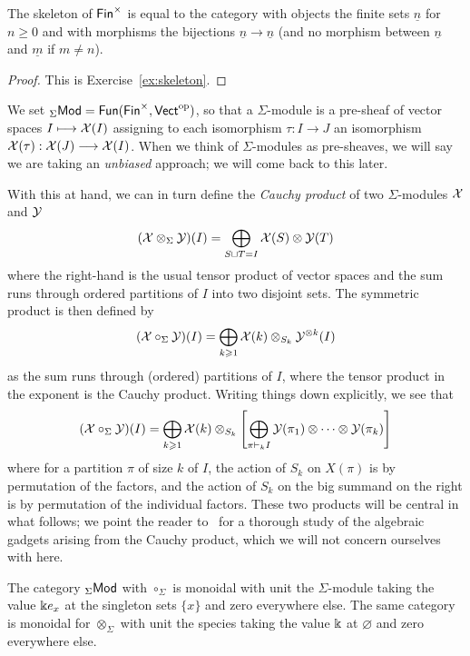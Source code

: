 \begin{lemma} The skeleton of $\mathsf{Fin}^\times$ is
equal to the category with objects the finite sets
$\underline{n}$ for $n\geqslant 0$ and with morphisms the
bijections $\underline{n}\longrightarrow \underline{n}$ (and no morphism
between $\underline{n}$ and $\underline{m}$ if $m\neq n$).
\end{lemma}

\begin{proof}
This is Exercise~\ref{ex:skeleton}.
\end{proof}

We set ${}_\Sigma\mathsf{Mod}  = 
\mathsf{Fun}(\mathsf{Fin}^\times,\mathsf{Vect}^{\mathrm{op}})$,
so that a $\Sigma$-module is a pre-sheaf of vector
spaces $I\longmapsto \mathcal{X}(I)$ assigning to each
isomorphism $\tau : I\longrightarrow J$ an isomorphism
$\mathcal{X}(\tau): \mathcal{X}(J)\longrightarrow \mathcal{X}(I)$. When we
think of $\Sigma$-modules as pre-sheaves, we will say we 
are taking an \emph{unbiased} approach; 
we will come back to this later.

With this at hand, 
we can in turn define the \emph{Cauchy product}
of two $\Sigma$-modules $\mathcal{X}$ and $\mathcal{Y}$
\[ (\mathcal{X}\otimes_\Sigma \mathcal{Y})(I) = 
 	\bigoplus_{S\sqcup T= I}
 		 \mathcal{X}(S)\otimes \mathcal{Y}(T)\] 
where the right-hand is the usual tensor product of
vector spaces
and the sum runs through ordered 
partitions of $I$ into
two disjoint sets. The symmetric product is then
defined by 
\[ (\mathcal{X}\circ_\Sigma \mathcal{Y})(I) 
 	= \bigoplus_{\substack{k\geqslant 1 }} \mathcal{X}(k) 
 		\otimes_{S_k} \mathcal{Y}^{\otimes k}(I)\] 
as the sum runs through (ordered) partitions of $I$, where the tensor product in the exponent is
the Cauchy product. Writing things down 
explicitly, we see that 
\[ (\mathcal{X}\circ_\Sigma \mathcal{Y})(I) 
 	= \bigoplus_{\substack{k\geqslant 1}}\mathcal{X}(k) 
 		\otimes_{S_k}
 		\left[
 		\bigoplus_{\pi\vdash_k I}\mathcal{Y}(\pi_1)\otimes\cdots\otimes
 			\mathcal{Y}(\pi_k) \right]\]
where for a partition $\pi$ of size $k$ of $I$,
the action of $S_k$ on $X(\pi)$ is by permutation
of the factors, and the action of $S_k$
on the big summand on the right is by permutation
of the individual factors. 
These two products will be central in what 
follows; we point the reader to~\cite{Aguiar2010}
for a thorough study of the algebraic
gadgets arising from the Cauchy product,
which we will not concern ourselves with
here.

\begin{lemma}
The category ${}_\Sigma\mathsf{Mod}$ with $\circ_\Sigma$ is
monoidal with unit the $\Sigma$-module taking the value $\Bbbk e_x$ at 
the singleton sets $\{x\}$ and zero everywhere else. The same
category is monoidal for $\otimes_\Sigma$ with unit
the species taking the value $\Bbbk$ at $\varnothing$
and zero everywhere else.
\end{lemma}

